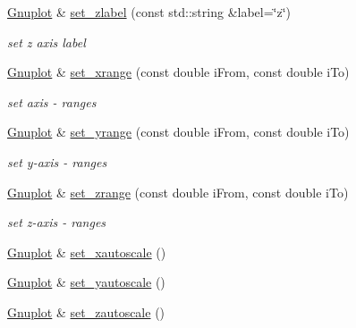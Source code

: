 \begin{DoxyCompactItemize}
\hyperlink{classGnuplot}{Gnuplot} \& \hyperlink{classGnuplot_ab3206e715d20f05cc0dd1eec89ce8b07}{set\+\_\+zlabel} (const std\+::string \&label=\char`\"{}z\char`\"{})
\begin{DoxyCompactList}\small\item\em set z axis label \end{DoxyCompactList}\item 
\mbox{\label{classGnuplot_a4b8d96018f2d2d4e2922d4df153d6a84}} 
\hyperlink{classGnuplot}{Gnuplot} \& \hyperlink{classGnuplot_a4b8d96018f2d2d4e2922d4df153d6a84}{set\+\_\+xrange} (const double i\+From, const double i\+To)
\begin{DoxyCompactList}\small\item\em set axis -\/ ranges \end{DoxyCompactList}\item 
\mbox{\label{classGnuplot_a461271b7bfd4f84bdfc0055457226f28}} 
\hyperlink{classGnuplot}{Gnuplot} \& \hyperlink{classGnuplot_a461271b7bfd4f84bdfc0055457226f28}{set\+\_\+yrange} (const double i\+From, const double i\+To)
\begin{DoxyCompactList}\small\item\em set y-\/axis -\/ ranges \end{DoxyCompactList}\item 
\mbox{\label{classGnuplot_a7273f6a48024117b4d234d0251106e78}} 
\hyperlink{classGnuplot}{Gnuplot} \& \hyperlink{classGnuplot_a7273f6a48024117b4d234d0251106e78}{set\+\_\+zrange} (const double i\+From, const double i\+To)
\begin{DoxyCompactList}\small\item\em set z-\/axis -\/ ranges \end{DoxyCompactList}\item 
\hyperlink{classGnuplot}{Gnuplot} \& \hyperlink{classGnuplot_a11a62a04c203f01607c3c21a727e318d}{set\+\_\+xautoscale} ()
\item 
\hyperlink{classGnuplot}{Gnuplot} \& \hyperlink{classGnuplot_a5b9e1a4e68f94d418a8e9194f168b448}{set\+\_\+yautoscale} ()
\item 
\hyperlink{classGnuplot}{Gnuplot} \& \hyperlink{classGnuplot_aef3e84e793836158e1ddd773d1465c37}{set\+\_\+zautoscale} ()
\item 
\mbox{\label{classGnuplot_aff546fad227d93babeb5d2cc9f047b89}} 

\end{DoxyCompactItemize}
